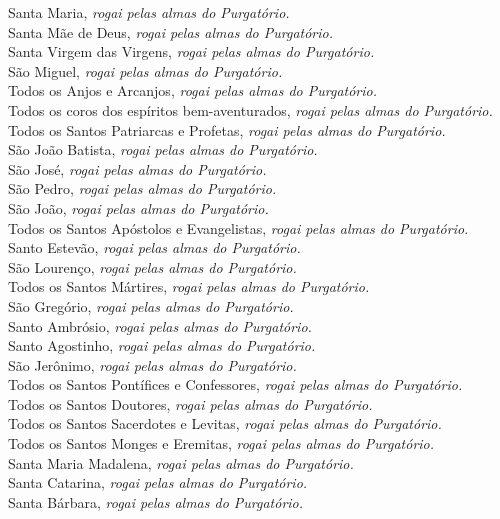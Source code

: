 Santa Maria, \textit{rogai pelas almas do Purgatório.} \\
Santa Mãe de Deus, \textit{rogai pelas almas do Purgatório.} \\
Santa Virgem das Virgens, \textit{rogai pelas almas do Purgatório.} \\
São Miguel, \textit{rogai pelas almas do Purgatório.} \\
Todos os Anjos e Arcanjos, \textit{rogai pelas almas do Purgatório.} \\
Todos os coros dos espíritos bem-aventurados, \textit{rogai pelas almas do Purgatório.} \\
Todos os Santos Patriarcas e Profetas, \textit{rogai pelas almas do Purgatório.} \\
São João Batista, \textit{rogai pelas almas do Purgatório.} \\
São José, \textit{rogai pelas almas do Purgatório.} \\
São Pedro, \textit{rogai pelas almas do Purgatório.} \\
São João, \textit{rogai pelas almas do Purgatório.} \\
Todos os Santos Apóstolos e Evangelistas, \textit{rogai pelas almas do Purgatório.} \\
Santo Estevão, \textit{rogai pelas almas do Purgatório.} \\
São Lourenço, \textit{rogai pelas almas do Purgatório.} \\
Todos os Santos Mártires, \textit{rogai pelas almas do Purgatório.} \\
São Gregório, \textit{rogai pelas almas do Purgatório.} \\
Santo Ambrósio, \textit{rogai pelas almas do Purgatório.} \\
Santo Agostinho, \textit{rogai pelas almas do Purgatório.} \\
São Jerônimo, \textit{rogai pelas almas do Purgatório.} \\
Todos os Santos Pontífices e Confessores, \textit{rogai pelas almas do Purgatório.} \\
Todos os Santos Doutores, \textit{rogai pelas almas do Purgatório.} \\
Todos os Santos Sacerdotes e Levitas, \textit{rogai pelas almas do Purgatório.} \\
Todos os Santos Monges e Eremitas, \textit{rogai pelas almas do Purgatório.} \\
Santa Maria Madalena, \textit{rogai pelas almas do Purgatório.} \\
Santa Catarina, \textit{rogai pelas almas do Purgatório.} \\
Santa Bárbara, \textit{rogai pelas almas do Purgatório.} \\


